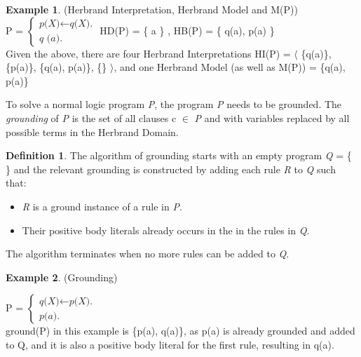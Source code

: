 \documentclass[11pt,twoside]{report}
\theoremstyle{plain}
\theoremstyle{definition}
\newtheorem{defn}[thm]{Definition} %
\newtheorem{examp}{Example}[section]
\begin{document}
\begin{examp} \normalfont (Herbrand Interpretation, Herbrand Model and M(P)) \\

P = $\begin{cases}
	\textit{p(X)}  \leftarrow \textit{q(X).} \\
	\textit{q (a).}
      \end{cases}$
HD(P) = \{ a \} , HB(P) = \{ q(a), p(a) \}  \\

Given the above, there are four Herbrand Interpretations HI(P) = $\langle$ \{q(a)\}, \{p(a)\}, \{q(a), p(a)\}, \{\} $\rangle$, and one Herbrand Model (as well as M(P)) = \{q(a), p(a)\}

\end{examp}

To solve a normal logic program \textit{P}, the program \textit{P} needs to be grounded. The \textit{grounding} of \textit{P} is the set of all clauses  c $\in$ \textit{P} and with variables replaced by all possible terms in the Herbrand Domain.
\begin{defn}
The algorithm of grounding starts with an empty program \textit{Q} = \{  \} and the relevant grounding is constructed by adding each rule \textit{R} to \textit{Q} such that:
\begin{itemize}
\item \textit{R} is a ground instance of a rule in \textit{P}.
\item Their positive body literals already occurs in the in the rules in \textit{Q}.
\end{itemize}
The algorithm terminates when no more rules can be added to \textit{Q}.
\end{defn}

\begin{examp} \normalfont (Grounding) \\
\label{grounding}

P = $\begin{cases}
	\textit{q(X)}  \leftarrow \textit{p(X).} \\
	\textit{p(a).}
      \end{cases}$ \\

ground(P) in this example is \{p(a), q(a)\}, as p(a) is already grounded and added to Q, and it is also a positive body literal for the first rule, resulting in q(a).
\end{examp}
\end{document}
